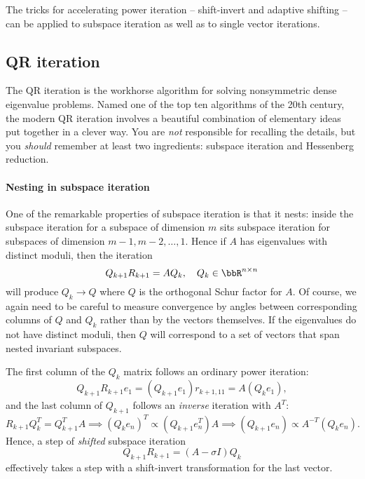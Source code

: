 \documentclass[12pt, leqno]{article}
\begin{document}
The tricks for accelerating power iteration -- shift-invert
and adaptive shifting -- can be applied to subspace iteration as
well as to single vector iterations.

\subsection{QR iteration}

The QR iteration is the workhorse algorithm for solving nonsymmetric
dense eigenvalue problems.  Named one of the top ten algorithms of the
20th century, the modern QR iteration involves a beautiful combination
of elementary ideas put together in a clever way.  You are {\em not}
responsible for recalling the details, but you {\em should} remember
at least two ingredients: subspace iteration and Hessenberg reduction.

\paragraph{Nesting in subspace iteration}
One of the remarkable properties of subspace iteration is that it
nests: inside the subspace iteration for a subspace of dimension $m$
sits subspace iteration for subspaces of dimension $m-1, m-2, \ldots, 1$.
Hence if $A$ has eigenvalues with distinct moduli, then the iteration
\[
  Q_{k+1} R_{k+1} = A Q_k, \quad Q_k \in \bbR^{n \times n}
\]
will produce $Q_k \rightarrow Q$ where $Q$ is the orthogonal Schur
factor for $A$.  Of course, we again need to be careful to measure
convergence by angles between corresponding columns of $Q$ and $Q_k$
rather than by the vectors themselves.  If the eigenvalues do not
have distinct moduli, then $Q$ will correspond to a set of vectors
that span nested invariant subspaces.

The first column of the $Q_k$ matrix follows an ordinary power iteration:
\[
  Q_{k+1} R_{k+1} e_1 = (Q_{k+1} e_1) r_{k+1,11} = A (Q_k e_1),
\]
and the last column of $Q_{k+1}$ follows an {\em inverse} iteration
with $A^T$:
\[
  R_{k+1} Q_k^T = Q_{k+1}^T A \implies
  (Q_k e_n)^T \propto (Q_{k+1} e_n^T) A \implies
  (Q_{k+1} e_n) \propto A^{-T} (Q_k e_n).
\]
Hence, a step of {\em shifted} subspace iteration
\[
  Q_{k+1} R_{k+1} = (A-\sigma I) Q_k
\]
effectively takes a step with a shift-invert transformation for
the last vector.
\end{document}
